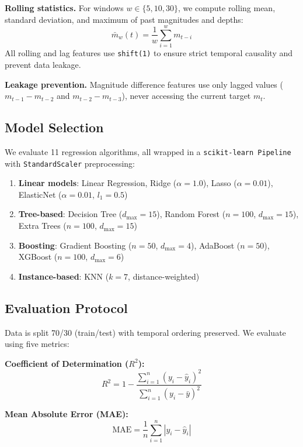 \documentclass[journal,10pt,twocolumn]{IEEEtran}
\begin{document}
\textbf{Rolling statistics.} For windows $w \in \{5, 10, 30\}$, we compute rolling mean, standard deviation, and maximum of past magnitudes and depths:
\begin{equation}
\bar{m}_w(t) = \frac{1}{w} \sum_{i=1}^{w} m_{t-i}
\label{eq:rolling}
\end{equation}
All rolling and lag features use \texttt{shift(1)} to ensure strict temporal causality and prevent data leakage.

\textbf{Leakage prevention.} Magnitude difference features use only lagged values ($m_{t-1} - m_{t-2}$ and $m_{t-2} - m_{t-3}$), never accessing the current target $m_t$.

\subsection{Model Selection}
\label{sec:models}

We evaluate 11 regression algorithms, all wrapped in a \texttt{scikit-learn Pipeline} with \texttt{StandardScaler} preprocessing:

\begin{enumerate}
    \item \textbf{Linear models}: Linear Regression, Ridge ($\alpha=1.0$), Lasso ($\alpha=0.01$), ElasticNet ($\alpha=0.01$, $l_1=0.5$)
    \item \textbf{Tree-based}: Decision Tree ($d_{\max}=15$), Random Forest ($n=100$, $d_{\max}=15$), Extra Trees ($n=100$, $d_{\max}=15$)
    \item \textbf{Boosting}: Gradient Boosting ($n=50$, $d_{\max}=4$), AdaBoost ($n=50$), XGBoost ($n=100$, $d_{\max}=6$)
    \item \textbf{Instance-based}: KNN ($k=7$, distance-weighted)
\end{enumerate}

\subsection{Evaluation Protocol}
\label{sec:evaluation}

Data is split 70/30 (train/test) with temporal ordering preserved. We evaluate using five metrics:

\textbf{Coefficient of Determination ($R^2$):}
\begin{equation}
R^2 = 1 - \frac{\sum_{i=1}^{n}(y_i - \hat{y}_i)^2}{\sum_{i=1}^{n}(y_i - \bar{y})^2}
\label{eq:r2}
\end{equation}

\textbf{Mean Absolute Error (MAE):}
\begin{equation}
\text{MAE} = \frac{1}{n}\sum_{i=1}^{n}|y_i - \hat{y}_i|
\label{eq:mae}
\end{equation}
\end{document}
